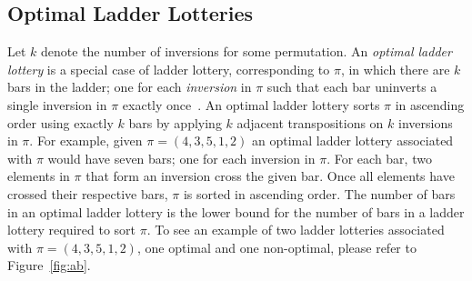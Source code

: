 \subsection{Optimal Ladder Lotteries}
Let $k$ denote the number of inversions for some permutation.
An \emph{optimal ladder lottery} is a special case of ladder 
lottery, corresponding to $\pi$, in which there are $k$ bars in the ladder; one for each \emph{inversion} in $\pi$ such that each 
bar uninverts a single inversion in $\pi$ exactly once~\cite{A1}.
An optimal ladder lottery sorts $\pi$ in ascending order using exactly $k$ bars by applying 
$k$ adjacent transpositions on $k$ inversions in $\pi$.
For example, given $\pi=(4,3,5,1,2)$ an optimal ladder lottery associated with $\pi$ would have 
seven bars; one for each inversion in $\pi$. For each bar, two elements in $\pi$ that form 
an inversion cross the given bar. 
Once all elements have crossed their respective bars, $\pi$ is sorted in ascending order. The number of bars in an optimal ladder lottery 
is the lower bound for the number of bars in a ladder lottery required to sort $\pi$. 
To see an example of two ladder lotteries associated with 
$\pi=(4,3,5,1,2)$, one optimal and one non-optimal, please refer to Figure~\ref{fig:ab}.
